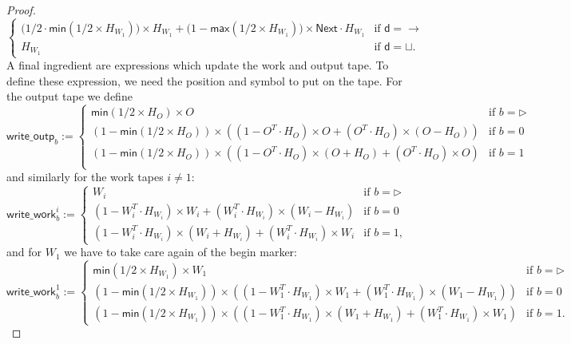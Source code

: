\begin{proof}
$$\begin{cases}
            \bigl(1/2\cdot\mathsf{min}(1/2\times H_{W_1})\bigr)\times H_{W_1} + \bigl(1-\mathsf{max}(1/2\times H_{W_1})\bigr)\times \mathsf{Next}\cdot H_{W_1}  &\text{if $\mathsf{d}=\rightarrow$}\\
        H_{W_1} & \text{if $\mathsf{d}=\sqcup$}. 	
    \end{cases}
    $$
    A final ingredient are expressions which update the work and output tape.
    To define these expression, we need the position and symbol to put on the tape. For the output tape we define
    $$
    \mathsf{write\_outp}_b:=\begin{cases}
    \mathsf{min}(1/2\times H_O)\times O & \text{if $b=\rhd$}\\
    (1-\mathsf{min}(1/2\times H_O))\times\left((1-O^T\cdot H_O)\times O + (O^T\cdot H_O)\times (O-H_O)\right) &\text{if $b=0$}\\
    (1-\mathsf{min}(1/2\times H_O))\times\left((1-O^T\cdot H_O)\times (O+H_O) + (O^T\cdot H_O)\times O\right) &\text{if $b=1$}\\
    \end{cases}
    $$
    and similarly for the work tapes $i\neq 1$:
    $$
    \mathsf{write\_work}_b^i:=\begin{cases}
    W_i & \text{if $b=\rhd$}\\
    (1-W_i^T\cdot H_{W_i})\times W_i + (W_i^T\cdot H_{W_i})\times (W_i-H_{W_i}) &\text{if $b=0$}\\
    (1-W_i^T\cdot H_{W_i})\times (W_i+H_{W_i}) + (W_i^T\cdot H_{W_i})\times W_i &\text{if $b=1$},
    \end{cases}
    $$
    and for  $W_1$ we have to take care again of the begin marker:
    $$
    \mathsf{write\_work}_b^1:=\begin{cases}
    \mathsf{min}(1/2\times H_{W_1})\times W_1 & \text{if $b=\rhd$}\\
    (1-\mathsf{min}(1/2\times H_{W_1}))\times\left((1-W_1^T\cdot H_{W_1})\times W_1 + (W_1^T\cdot H_{W_1})\times (W_1-H_{W_1})\right) &\text{if $b=0$}\\
    (1-\mathsf{min}(1/2\times H_{W_1}))\times\left((1-W_1^T\cdot H_{W_1})\times (W_1+H_{W_1}) + (W_1^T\cdot H_{W_1})\times W_1\right) &\text{if $b=1$}.
    \end{cases}
    $$


\end{proof}
